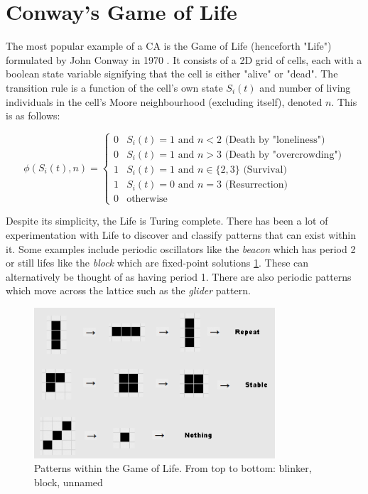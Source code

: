 \section{Conway's Game of Life}
The most popular example of a CA is the Game of Life (henceforth "Life") formulated by John Conway in 1970 \cite{gardner1970fantastic}. It consists of a 2D grid of cells, each with a boolean state variable signifying that the cell is either "alive" or "dead". The transition rule is a function of the cell's own state $S_i(t)$ and number of living individuals in the cell's Moore neighbourhood (excluding itself), denoted $n$. This is as follows:

\begin{equation}
  \phi(S_i(t), n) = 
\begin{cases}
  0 & S_i(t) = 1 \text{ and } n < 2 \text{  (Death by "loneliness")}\\
  0 & S_i(t) = 1 \text{ and } n > 3 \text{  (Death by "overcrowding")}\\
  1 & S_i(t) = 1 \text{ and } n \in \{2,3\} \text{  (Survival)}\\
  1 & S_i(t) = 0 \text{ and } n = 3 \text{  (Resurrection)}\\
  0 & \text{otherwise}
\end{cases}
\end{equation}

Despite its simplicity, the Life is Turing complete. There has been a lot of experimentation with Life to discover and classify patterns that can exist within it. Some examples include periodic oscillators like the \textit{beacon} which has period 2 or still lifes like the \textit{block} which are fixed-point solutions \ref{fig:life-patterns}. These can alternatively be thought of as having period 1. There are also periodic patterns which move across the lattice such as the \textit{glider} pattern.

\begin{figure}[!h]
\centering
\includegraphics[width=0.8\textwidth]{images/life-patterns.png}
\caption{Patterns within the Game of Life. From top to bottom: blinker, block, unnamed \cite{lipa}}
\label{fig:life-patterns}
\end{figure}


